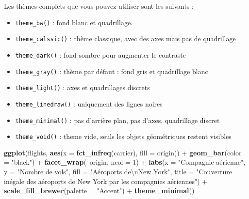 \documentclass[a4paperpaper,]{article}
\newenvironment{Shaded}{\begin{snugshade}}{\end{snugshade}}
\newcommand{\CharTok}[1]{\textcolor[rgb]{0.57,0.30,0.62}{#1}}
\newcommand{\DataTypeTok}[1]{\textcolor[rgb]{0.00,0.34,0.68}{#1}}
\newcommand{\DecValTok}[1]{\textcolor[rgb]{0.69,0.50,0.00}{#1}}
\newcommand{\KeywordTok}[1]{\textcolor[rgb]{0.12,0.11,0.11}{\textbf{#1}}}
\newcommand{\NormalTok}[1]{\textcolor[rgb]{0.12,0.11,0.11}{#1}}
\newcommand{\OperatorTok}[1]{\textcolor[rgb]{0.12,0.11,0.11}{#1}}
\newcommand{\StringTok}[1]{\textcolor[rgb]{0.75,0.01,0.01}{#1}}
\providecommand{\tightlist}{%
  \setlength{\itemsep}{0pt}\setlength{\parskip}{0pt}}
\theoremstyle{definition}
\theoremstyle{definition}
\theoremstyle{definition}
\theoremstyle{remark}
\begin{document}
Les thèmes complets que vous pouvez utiliser sont les suivants :

\begin{itemize}
\tightlist
\item
  \texttt{theme\_bw()} : fond blanc et quadrillage.
\item
  \texttt{theme\_calssic()} : thème classique, avec des axes mais pas de
  quadrillage
\item
  \texttt{theme\_dark()} : fond sombre pour augmenter le contraste
\item
  \texttt{theme\_gray()} : thème par défaut : fond gris et quadrillage
  blanc
\item
  \texttt{theme\_light()} : axes et quadrillages discrets
\item
  \texttt{theme\_linedraw()} : uniquement des lignes noires
\item
  \texttt{theme\_minimal()} : pas d'arrière plan, pas d'axes,
  quadrillage discret
\item
  \texttt{theme\_void()} : theme vide, seuls les objets géométriques
  restent visibles
\end{itemize}

\begin{Shaded}
\begin{Highlighting}[]
\KeywordTok{ggplot}\NormalTok{(flights, }\KeywordTok{aes}\NormalTok{(}\DataTypeTok{x =} \KeywordTok{fct_infreq}\NormalTok{(carrier), }\DataTypeTok{fill =}\NormalTok{ origin)) }\OperatorTok{+}
\StringTok{  }\KeywordTok{geom_bar}\NormalTok{(}\DataTypeTok{color =} \StringTok{"black"}\NormalTok{) }\OperatorTok{+}
\StringTok{  }\KeywordTok{facet_wrap}\NormalTok{(}\OperatorTok{~}\NormalTok{origin, }\DataTypeTok{ncol =} \DecValTok{1}\NormalTok{) }\OperatorTok{+}
\StringTok{  }\KeywordTok{labs}\NormalTok{(}\DataTypeTok{x =} \StringTok{"Compagnie aérienne"}\NormalTok{,}
       \DataTypeTok{y =} \StringTok{"Nombre de vols"}\NormalTok{,}
       \DataTypeTok{fill =} \StringTok{"Aéroports de}\CharTok{\textbackslash{}n}\StringTok{New York"}\NormalTok{,}
       \DataTypeTok{title =} \StringTok{"Couverture inégale des aéroports de New York par les compagnies aériennes"}\NormalTok{) }\OperatorTok{+}
\StringTok{  }\KeywordTok{scale_fill_brewer}\NormalTok{(}\DataTypeTok{palette =} \StringTok{"Accent"}\NormalTok{) }\OperatorTok{+}
\StringTok{  }\KeywordTok{theme_minimal}\NormalTok{()}
\end{Highlighting}
\end{Shaded}
\end{document}

